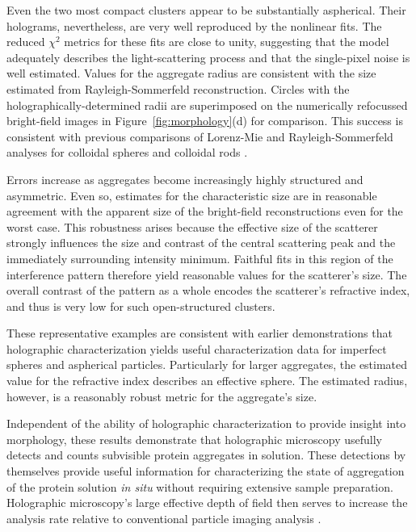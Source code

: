 Even the two most compact clusters appear to be substantially aspherical.
Their holograms, nevertheless, are very well reproduced by the nonlinear fits.
The reduced $\chi^2$ metrics for these fits are close to unity, suggesting
that the model adequately describes the light-scattering process
and that the single-pixel noise is well estimated.
Values for the aggregate radius are consistent with the size estimated
from Rayleigh-Sommerfeld reconstruction.
Circles with the holographically-determined radii are superimposed on the 
numerically refocussed bright-field images in Figure~\ref{fig:morphology}(d) 
for comparison.
This success is consistent with previous comparisons of Lorenz-Mie and
Rayleigh-Sommerfeld analyses for colloidal spheres \cite{cheong10a}
and colloidal rods \cite{cheong10}.

Errors increase as aggregates become increasingly highly structured
and asymmetric.  Even so, estimates for the characteristic size
are in reasonable agreement with the apparent size of the bright-field
reconstructions even for the worst case.
This robustness arises because the effective size of the scatterer
strongly influences the size and contrast of the central scattering
peak and the immediately surrounding intensity minimum.
Faithful fits in this region of the interference pattern therefore yield
reasonable values for the scatterer's size.
The overall contrast of the pattern as a whole encodes the scatterer's
refractive index, and thus is very low for such open-structured
clusters.

These representative examples are consistent with
earlier demonstrations \cite{cheong11,hannel15} that holographic
characterization yields useful characterization data for
imperfect spheres and aspherical particles.
Particularly for larger aggregates, the estimated value
for the refractive index describes an effective sphere.
The estimated radius, however, is a reasonably robust
metric for the aggregate's size.

Independent of the ability of holographic characterization to provide
insight into morphology, these results demonstrate
that holographic microscopy usefully detects and counts
subvisible protein aggregates in solution.
These detections by themselves
provide useful information for characterizing the state of aggregation
of the protein solution \emph{in situ} without requiring
extensive sample preparation.
Holographic microscopy's large effective depth of field
then serves to increase the analysis rate relative to
conventional particle imaging analysis \cite{filipe10}.

